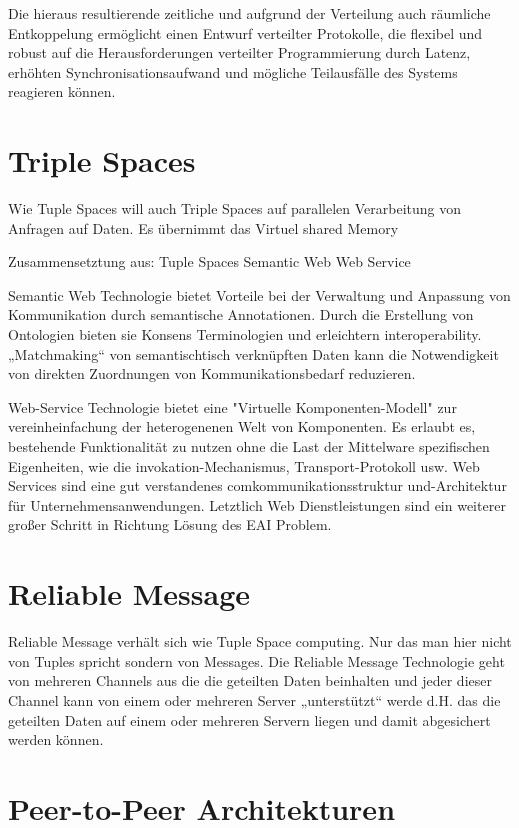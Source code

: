 \documentclass[a4paper,12pt]{scrreprt}
\begin{document}
		Die hieraus resultierende zeitliche und aufgrund der Verteilung auch räumliche Entkoppelung ermöglicht einen Entwurf verteilter Protokolle, die flexibel und robust auf die Herausforderungen verteilter Programmierung durch Latenz, erhöhten Synchronisationsaufwand und mögliche Teilausfälle des Systems reagieren können.
		
		
		\section{Triple Spaces}
		
		Wie Tuple Spaces will auch Triple Spaces auf parallelen Verarbeitung von Anfragen auf Daten. Es übernimmt das Virtuel shared Memory 
		
		Zusammensetztung aus:
		Tuple Spaces
		Semantic Web
		Web Service
		
		
		Semantic Web Technologie bietet Vorteile bei der Verwaltung und Anpassung von Kommunikation durch semantische Annotationen. Durch die Erstellung von Ontologien bieten sie Konsens Terminologien und erleichtern interoperability. „Matchmaking“ von semantischtisch verknüpften Daten kann die Notwendigkeit von direkten Zuordnungen von Kommunikationsbedarf reduzieren.
		
		
		Web-Service Technologie bietet eine 
		"Virtuelle Komponenten-Modell" zur vereinheinfachung der 
		heterogenenen Welt von Komponenten. Es  erlaubt es, bestehende Funktionalität zu nutzen 
		ohne die Last der Mittelware spezifischen Eigenheiten, wie die invokation-Mechanismus, Transport-Protokoll usw. Web Services sind eine gut verstandenes comkommunikationsstruktur und-Architektur für Unternehmensanwendungen. Letztlich Web 
		Dienstleistungen sind ein weiterer großer Schritt in Richtung 
		Lösung des EAI Problem.
		
		\section{Reliable Message}
			
			Reliable Message verhält sich wie Tuple Space computing. Nur das man hier nicht von Tuples spricht sondern von Messages.  Die Reliable Message Technologie geht von mehreren Channels aus die die geteilten Daten beinhalten und jeder dieser Channel kann von einem oder mehreren Server „unterstützt“ werde d.H.  das die geteilten Daten auf einem oder mehreren Servern liegen und damit abgesichert werden können. 
		
		\section{Peer-to-Peer Architekturen}
			
\end{document}
